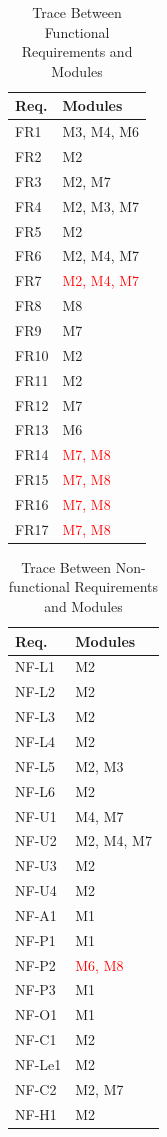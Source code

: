 \documentclass[12pt, titlepage]{article}
\begin{document}
\begin{table}[H]
\centering
\begin{tabular}{p{} p{}}
\toprule
\textbf{Req.} & \textbf{Modules}\\
\midrule
FR1 & M3, M4, M6 \\
FR2 & M2\\
FR3 & M2, M7\\
FR4 & M2, M3, M7\\
FR5 & M2\\
FR6 & M2, M4, M7\\
FR7 & \textcolor{red}{M2, M4, M7}\\
FR8 & M8\\
FR9 & M7\\
FR10 & M2\\
FR11 & M2\\
FR12 & M7\\
FR13 & M6\\
FR14 & \textcolor{red}{M7, M8}\\
FR15 & \textcolor{red}{M7, M8}\\
FR16 & \textcolor{red}{M7, M8}\\
FR17 & \textcolor{red}{M7, M8}\\
\bottomrule
\end{tabular}
\caption{Trace Between Functional Requirements and Modules}
\label{TblRT}
\end{table}

\begin{table}[H]
\centering
\begin{tabular}{p{} p{}}
\toprule
\textbf{Req.} & \textbf{Modules}\\
\midrule
NF-L1 & M2\\
NF-L2 & M2\\
NF-L3 & M2\\
NF-L4 & M2\\
NF-L5 & M2, M3\\
NF-L6 & M2\\
NF-U1 & M4, M7\\
NF-U2 & M2, M4, M7\\
NF-U3 & M2\\
NF-U4 & M2\\
NF-A1 & M1\\
NF-P1 & M1\\
NF-P2 & \textcolor{red}{M6, M8}\\
NF-P3 & M1\\
NF-O1 & M1\\
NF-C1 & M2\\
NF-Le1 & M2\\
NF-C2 & M2, M7\\
NF-H1 & M2\\
\bottomrule
\end{tabular}
\caption{Trace Between Non-functional Requirements and Modules}
\label{TblRT}
\end{table}
\end{document}
